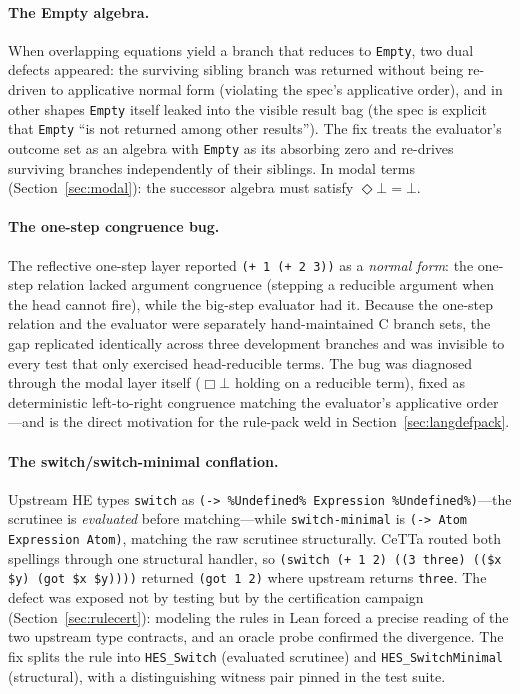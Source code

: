 \documentclass[11pt]{article}
\newcommand{\code}[1]{\texttt{#1}}
\newcommand{\HE}{\textup{HE}}
\newcommand{\CeTTa}{\textup{CeTTa}}
\begin{document}
\paragraph{The Empty algebra.}  When overlapping equations yield a
branch that reduces to \code{Empty}, two dual defects appeared: the
surviving sibling branch was returned without being re-driven to
applicative normal form (violating the spec's applicative order), and
in other shapes \code{Empty} itself leaked into the visible result bag
(the spec is explicit that \code{Empty} ``is not returned among other
results'').  The fix treats the evaluator's outcome set as an algebra
with \code{Empty} as its absorbing zero and re-drives surviving
branches independently of their siblings.  In modal terms
(Section~\ref{sec:modal}): the successor algebra must satisfy
$\Diamond\bot = \bot$.

\paragraph{The one-step congruence bug.}  The reflective one-step
layer reported \code{(+ 1 (+ 2 3))} as a \emph{normal form}: the
one-step relation lacked argument congruence (stepping a reducible
argument when the head cannot fire), while the big-step evaluator had
it.  Because the one-step relation and the evaluator were separately
hand-maintained C branch sets, the gap replicated identically across
three development branches and was invisible to every test that only
exercised head-reducible terms.  The bug was diagnosed through the
modal layer itself ($\Box\bot$ holding on a reducible term), fixed
as deterministic left-to-right congruence matching the evaluator's
applicative order---and is the direct motivation for the rule-pack
weld in Section~\ref{sec:langdefpack}.

\paragraph{The switch/switch-minimal conflation.}  Upstream \HE{}
types \code{switch} as \code{(-> \%Undefined\% Expression
\%Undefined\%)}---the scrutinee is \emph{evaluated} before
matching---while \code{switch-minimal} is \code{(-> Atom Expression
Atom)}, matching the raw scrutinee structurally.  \CeTTa{} routed both
spellings through one structural handler, so
\code{(switch (+ 1 2) ((3 three) ((\$x \$y) (got \$x \$y))))} returned
\code{(got 1 2)} where upstream returns \code{three}.  The defect was
exposed not by testing but by the certification campaign
(Section~\ref{sec:rulecert}): modeling the rules in Lean forced a
precise reading of the two upstream type contracts, and an oracle
probe confirmed the divergence.  The fix splits the rule into
\code{HES\_Switch} (evaluated scrutinee) and \code{HES\_SwitchMinimal}
(structural), with a distinguishing witness pair pinned in the test
suite.
\end{document}
